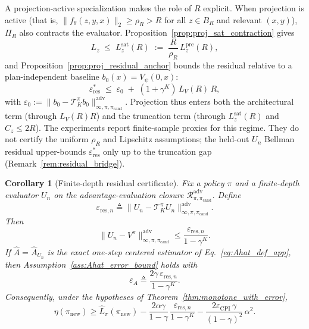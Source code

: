 \documentclass{article}
\theoremstyle{plain}
\newtheorem{corollary}[theorem]{Corollary}
\theoremstyle{definition}
\theoremstyle{remark}
\begin{document}
A projection-active specialization makes the role of $R$ explicit. When projection is active (that is, $\|f_\theta(z,y,x)\|_2\ge\rho_R>R$ for all $z\in B_R$ and relevant $(x,y)$), $\Pi_R$ also contracts the evaluator. Proposition~\ref{prop:proj_sat_contraction} gives
\begin{equation}
L_z\;\le\;L_z^{\mathrm{sat}}(R)\;:=\;\frac{R}{\rho_R}\,L_z^{\mathrm{pre}}(R),
\label{eq:Lz_sat}
\end{equation}
and Proposition~\ref{prop:proj_residual_anchor} bounds the residual relative to a plan-independent baseline $b_0(x)=V_\psi(0,x)$:
\begin{equation}
\varepsilon_{\mathrm{res}}^*\;\le\;\varepsilon_0\;+\;(1+\gamma^K)\,L_V(R)\,R,
\label{eq:eps_res_proj}
\end{equation}
with $\varepsilon_0:=\|b_0-\mathcal{T}^\pi_K b_0\|_{\infty,\pi,\pi_{\mathrm{cand}}}^{\mathrm{adv}}$. Projection thus enters both the architectural term (through $L_V(R)R$) and the truncation term (through $L_z^{\mathrm{sat}}(R)$ and $C_z\le 2R$). The experiments report finite-sample proxies for this regime. They do not certify the uniform $\rho_R$ and Lipschitz assumptions; the held-out $U_n$ Bellman residual upper-bounds $\varepsilon_{\mathrm{res}}^*$ only up to the truncation gap (Remark~\ref{rem:residual_bridge}).

\begin{corollary}[Finite-depth residual certificate]
\label{cor:finite_depth_residual_certificate}
Fix a policy $\pi$ and a finite-depth evaluator $U_n$ on the advantage-evaluation closure $\mathcal{R}_{\pi,\pi_{\mathrm{cand}}}^{\mathrm{adv}}$. Define
\begin{equation}
\varepsilon_{\mathrm{res},n}
\triangleq
\|U_n-\mathcal{T}^\pi_K U_n\|_{\infty,\pi,\pi_{\mathrm{cand}}}^{\mathrm{adv}}.
\label{eq:eps_res_n_def}
\end{equation}
Then
\begin{equation}
\|U_n-V^\pi\|_{\infty,\pi,\pi_{\mathrm{cand}}}^{\mathrm{adv}}
\le
\frac{\varepsilon_{\mathrm{res},n}}{1-\gamma^K}.
\label{eq:finite_depth_residual_certificate}
\end{equation}
If $\widehat A=\widehat A_{U_n}$ is the exact one-step centered estimator of Eq.~\eqref{eq:Ahat_def_app}, then Assumption~\ref{ass:Ahat_error_bound} holds with
\begin{equation}
\varepsilon_A
\triangleq
\frac{2\gamma\,\varepsilon_{\mathrm{res},n}}{1-\gamma^K}.
\label{eq:finite_depth_residual_adv}
\end{equation}
Consequently, under the hypotheses of Theorem~\ref{thm:monotone_with_error},
\begin{equation}
\eta(\pi_{\mathrm{new}})
\ge
\widehat{L}_\pi(\pi_{\mathrm{new}})
-
\frac{2\alpha\gamma}{1-\gamma}\,
\frac{\varepsilon_{\mathrm{res},n}}{1-\gamma^K}
-
\frac{2\varepsilon_{\mathrm{CPI}}\,\gamma}{(1-\gamma)^2}\,\alpha^2.
\label{eq:finite_depth_residual_cpi}
\end{equation}
\end{corollary}
\end{document}
